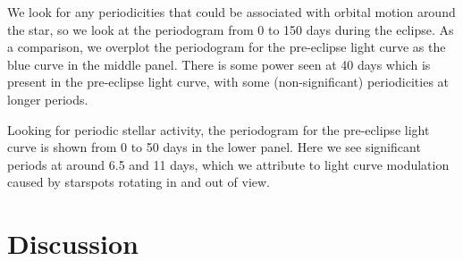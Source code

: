 \documentclass{aa}
\begin{document}
%
%
We look for any periodicities that could be associated with orbital motion around the star, so we look at the periodogram from 0 to 150 days during the eclipse.
%
As a comparison, we overplot the periodogram for the pre-eclipse light curve as the blue curve in the middle panel. 
%
There is some power seen at 40 days which is present in the pre-eclipse light curve, with some (non-significant) periodicities at longer periods.

Looking for periodic stellar activity, the periodogram for the pre-eclipse light curve is shown from 0 to 50 days in the lower panel.
%
Here we see significant periods at around 6.5 and 11 days, which we attribute to light curve modulation caused by starspots rotating in and out of view. 





\section{Discussion}\label{sec:discussion}
\end{document}
